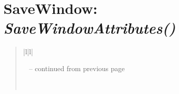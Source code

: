 \documentclass[letterpaper,10pt,english]{sphinxmanual}
\begin{document}
\section{\textbf{SaveWindow}: \emph{SaveWindowAttributes()}}
\label{attributes:savewindow-savewindowattributes}
\begin{DUlineblock}{0em}
\item[] 
\end{DUlineblock}
\begin{quote}

\begin{longtable}{|l|l|}
\hline
\endfirsthead

%
{{\textsf{\tablename\ \thetable{} -- continued from previous page}}} \\
\hline
\endhead

\hline {} \\ \hline
\endfoot

\endlastfoot



\end{longtable}
\end{quote}
\end{document}
